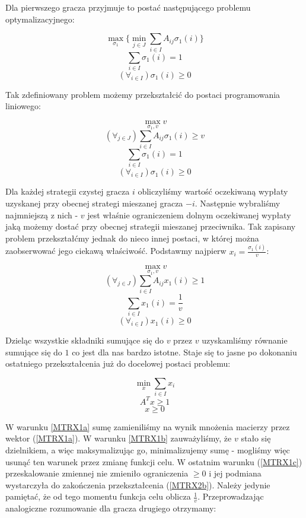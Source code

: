 \documentclass[polish]{standalone}
\begin{document}
Dla pierwszego gracza przyjmuje to postać następującego problemu optymalizacyjnego:

$$\max_{\sigma_1} \{ \min_{j \in J} \sum_{i \in I} A_{ij} \sigma_1(i) \}$$
$$\sum_{i \in I} \sigma_1(i) = 1$$
$$(\forall_{i \in I}) \sigma_1(i) \geq 0$$

Tak zdefiniowany problem możemy przekształcić do postaci programowania liniowego:

$$\max_{\sigma_1,v} v$$
$$(\forall_{j \in J}) \sum_{i \in I} A_{ij} \sigma_1(i) \geq v$$
$$\sum_{i \in I} \sigma_1(i) = 1$$
$$(\forall_{i \in I}) \sigma_1(i) \geq 0$$

Dla każdej strategii czystej gracza $i$ obliczyliśmy wartość oczekiwaną wypłaty uzyskanej przy obecnej strategi
mieszanej gracza $-i$. Następnie wybraliśmy najmniejszą z nich - $v$ jest właśnie ograniczeniem dolnym oczekiwanej
wypłaty jaką możemy dostać przy obecnej strategii mieszanej przeciwnika. Tak zapisany problem przekształćmy jednak do
nieco innej postaci, w której można zaobserwować jego ciekawą właściwość. Podstawmy najpierw $x_i = 
\frac{\sigma_1(i)}{v}$:

$$\max_{\sigma_1,v} v$$
\begin{equation}
(\forall_{j \in J}) \sum_{i \in I} A_{ij} x_1(i) \geq 1 \label{MTRX1a}
\end{equation}
\begin{equation}
\sum_{i \in I} x_1(i) = \frac{1}{v} \label{MTRX1b}
\end{equation}
\begin{equation}
(\forall_{i \in I}) x_1(i) \geq 0 \label{MTRX1c}
\end{equation}


Dzieląc wszystkie składniki sumujące się do $v$ przez $v$ uzyskamliśmy równanie sumujące się do $1$ co jest dla nas
bardzo istotne. Staje się to jasne po dokonaniu ostatniego przekształcenia już do docelowej postaci problemu:

$$\min_x \sum_{i \in I} x_i$$
\begin{equation}
A^Tx \geq 1 \label{MTRX2a}
\end{equation}
\begin{equation}
x \geq 0 \label{MTRX2b}
\end{equation}

W warunku \ref{MTRX1a} sumę zamieniliśmy na wynik mnożenia macierzy przez wektor (\ref{MTRX1a}). W warunku \ref{MTRX1b}
zauważyliśmy, że $v$ stało się dzielnikiem, a więc maksymalizując go, minimalizujemy sumę - mogliśmy więc usunąć ten
warunek przez zmianę funkcji celu. W ostatnim warunku (\ref{MTRX1c}) przeskalowanie zmiennej nie zmieniło ograniczenia
$\geq 0$ i jej podmiana wystarczyła do zakończenia przekształcenia (\ref{MTRX2b}). Należy jedynie pamiętać, że od tego
momentu funkcja celu oblicza $\frac{1}{v}$. Przeprowadzając analogiczne rozumowanie dla gracza drugiego otrzymamy:
\end{document}
